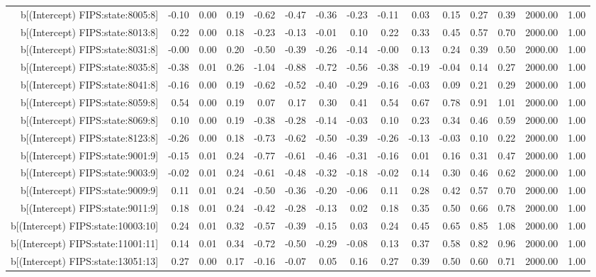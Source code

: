 \begin{table}[ht]
\begin{tabular}{rrrrrrrrrrrrrrr}
  b[(Intercept) FIPS:state:8005:8] & -0.10 & 0.00 & 0.19 & -0.62 & -0.47 & -0.36 & -0.23 & -0.11 & 0.03 & 0.15 & 0.27 & 0.39 & 2000.00 & 1.00 \\ 
  b[(Intercept) FIPS:state:8013:8] & 0.22 & 0.00 & 0.18 & -0.23 & -0.13 & -0.01 & 0.10 & 0.22 & 0.33 & 0.45 & 0.57 & 0.70 & 2000.00 & 1.00 \\ 
  b[(Intercept) FIPS:state:8031:8] & -0.00 & 0.00 & 0.20 & -0.50 & -0.39 & -0.26 & -0.14 & -0.00 & 0.13 & 0.24 & 0.39 & 0.50 & 2000.00 & 1.00 \\ 
  b[(Intercept) FIPS:state:8035:8] & -0.38 & 0.01 & 0.26 & -1.04 & -0.88 & -0.72 & -0.56 & -0.38 & -0.19 & -0.04 & 0.14 & 0.27 & 2000.00 & 1.00 \\ 
  b[(Intercept) FIPS:state:8041:8] & -0.16 & 0.00 & 0.19 & -0.62 & -0.52 & -0.40 & -0.29 & -0.16 & -0.03 & 0.09 & 0.21 & 0.29 & 2000.00 & 1.00 \\ 
  b[(Intercept) FIPS:state:8059:8] & 0.54 & 0.00 & 0.19 & 0.07 & 0.17 & 0.30 & 0.41 & 0.54 & 0.67 & 0.78 & 0.91 & 1.01 & 2000.00 & 1.00 \\ 
  b[(Intercept) FIPS:state:8069:8] & 0.10 & 0.00 & 0.19 & -0.38 & -0.28 & -0.14 & -0.03 & 0.10 & 0.23 & 0.34 & 0.46 & 0.59 & 2000.00 & 1.00 \\ 
  b[(Intercept) FIPS:state:8123:8] & -0.26 & 0.00 & 0.18 & -0.73 & -0.62 & -0.50 & -0.39 & -0.26 & -0.13 & -0.03 & 0.10 & 0.22 & 2000.00 & 1.00 \\ 
  b[(Intercept) FIPS:state:9001:9] & -0.15 & 0.01 & 0.24 & -0.77 & -0.61 & -0.46 & -0.31 & -0.16 & 0.01 & 0.16 & 0.31 & 0.47 & 2000.00 & 1.00 \\ 
  b[(Intercept) FIPS:state:9003:9] & -0.02 & 0.01 & 0.24 & -0.61 & -0.48 & -0.32 & -0.18 & -0.02 & 0.14 & 0.30 & 0.46 & 0.62 & 2000.00 & 1.00 \\ 
  b[(Intercept) FIPS:state:9009:9] & 0.11 & 0.01 & 0.24 & -0.50 & -0.36 & -0.20 & -0.06 & 0.11 & 0.28 & 0.42 & 0.57 & 0.70 & 2000.00 & 1.00 \\ 
  b[(Intercept) FIPS:state:9011:9] & 0.18 & 0.01 & 0.24 & -0.42 & -0.28 & -0.13 & 0.02 & 0.18 & 0.35 & 0.50 & 0.66 & 0.78 & 2000.00 & 1.00 \\ 
  b[(Intercept) FIPS:state:10003:10] & 0.24 & 0.01 & 0.32 & -0.57 & -0.39 & -0.15 & 0.03 & 0.24 & 0.45 & 0.65 & 0.85 & 1.08 & 2000.00 & 1.00 \\ 
  b[(Intercept) FIPS:state:11001:11] & 0.14 & 0.01 & 0.34 & -0.72 & -0.50 & -0.29 & -0.08 & 0.13 & 0.37 & 0.58 & 0.82 & 0.96 & 2000.00 & 1.00 \\ 
  b[(Intercept) FIPS:state:13051:13] & 0.27 & 0.00 & 0.17 & -0.16 & -0.07 & 0.05 & 0.16 & 0.27 & 0.39 & 0.50 & 0.60 & 0.71 & 2000.00 & 1.00 \\ 

\end{tabular}
\end{table}
